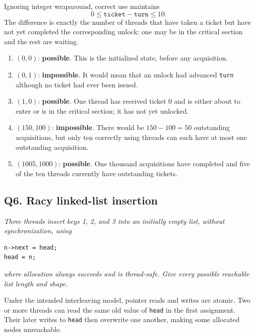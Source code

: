 Ignoring integer wraparound, correct use maintains
\[
0\leq \texttt{ticket}-\texttt{turn}\leq 10.
\]
The difference is exactly the number of threads that have taken a ticket but
have not yet completed the corresponding unlock: one may be in the critical
section and the rest are waiting.

\begin{enumerate}
\item[(a)] \((0,0)\): \textbf{possible}.  This is the initialized state,
before any acquisition.

\item[(b)] \((0,1)\): \textbf{impossible}.  It would mean that an unlock had
advanced \texttt{turn} although no ticket had ever been issued.

\item[(c)] \((1,0)\): \textbf{possible}.  One thread has received ticket 0
and is either about to enter or is in the critical section; it has not yet
unlocked.

\item[(d)] \((150,100)\): \textbf{impossible}.  There would be
\(150-100=50\) outstanding acquisitions, but only ten correctly using
threads can each have at most one outstanding acquisition.

\item[(e)] \((1005,1000)\): \textbf{possible}.  One thousand acquisitions
have completed and five of the ten threads currently have outstanding
tickets.
\end{enumerate}

\subsection*{Q6. Racy linked-list insertion}

\emph{Three threads insert keys 1, 2, and 3 into an initially empty list,
without synchronization, using}

\begin{verbatim}
n->next = head;
head = n;
\end{verbatim}

\emph{where allocation always succeeds and is thread-safe.  Give every
possible reachable list length and shape.}

Under the intended interleaving model, pointer reads and writes are atomic.
Two or more threads can read the same old value of \texttt{head} in the
first assignment.  Their later writes to \texttt{head} then overwrite one
another, making some allocated nodes unreachable.

